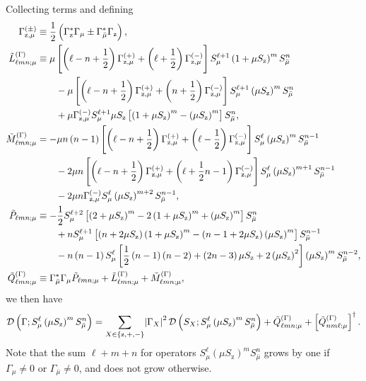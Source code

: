 \documentclass[aps,11pt,notitlepage,nofootinbib,longbibliography]{revtex4-1}
\newcommand{\f}[2]{\dfrac{#1}{#2}} %
\newcommand{\p}[1]{\left(#1\right)} %
\renewcommand{\sp}[1]{\left[#1\right]} %
\renewcommand{\set}[1]{\left\{#1\right\}} %
\newcommand{\D}{\mathcal{D}}
\newcommand{\z}{\text{z}}
\newcommand{\bmu}{{\bar\mu}}
\newcommand{\1}{\mathds{1}}
\begin{document}
Collecting terms and defining
\begin{align}
  \Gamma_{\z,\mu}^{(\pm)}
  &\equiv \f12\p{\Gamma_\z^* \Gamma_\mu \pm \Gamma_\bmu^* \Gamma_\z},
  \allowdisplaybreaks \\
  \tilde L_{\ell mn;\mu}^{(\Gamma)}
  &\equiv \mu \sp{\p{\ell-n+\f12} \Gamma_{\z,\mu}^{(+)}
    + \p{\ell+\f12} \Gamma_{\z,\mu}^{(-)}}
  S_\mu^{\ell+1} \p{1+\mu S_\z}^m S_\bmu^n \notag \\
  &\qquad -\mu \sp{\p{\ell-n+\f12} \Gamma_{\z,\mu}^{(+)}
    + \p{n+\f12} \Gamma_{\z,\mu}^{(-)}}
  S_\mu^{\ell+1} \p{\mu S_\z}^m S_\bmu^n \notag \\
  &\qquad + \mu \Gamma_{\z,\mu}^{(-)}
  S_\mu^{\ell+1} \mu S_\z
  \sp{\p{1+\mu S_\z}^m - \p{\mu S_\z}^m} S_\bmu^n,
  \allowdisplaybreaks \\
  \tilde M_{\ell mn;\mu}^{(\Gamma)}
  &= -\mu n\p{n-1} \sp{\p{\ell-n+\f12} \Gamma_{\z,\mu}^{(+)}
    + \p{\ell-\f12} \Gamma_{\z,\mu}^{(-)}}
  S_\mu^\ell \p{\mu S_\z}^m S_\bmu^{n-1} \notag \\
  &\qquad - 2\mu n \sp{\p{\ell-n+\f12} \Gamma_{\z,\mu}^{(+)}
    + \p{\ell+\f12n-1} \Gamma_{\z,\mu}^{(-)}}
  S_\mu^\ell \p{\mu S_\z}^{m+1} S_\bmu^{n-1} \notag \\
  &\qquad - 2\mu n \Gamma_{\z,\mu}^{(-)}
  S_\mu^\ell \p{\mu S_\z}^{m+2} S_\bmu^{n-1},
  \allowdisplaybreaks \\
  \tilde P_{\ell mn;\mu}
  &\equiv -\f12 S_\mu^{\ell+2}
  \sp{\p{2+\mu S_\z}^m - 2\p{1+\mu S_\z}^m + \p{\mu S_\z}^m}
  S_\bmu^n \notag \\
  &\qquad + n S_\mu^{\ell+1} \sp{\p{n+2\mu S_\z} \p{1+\mu S_\z}^m
    - \p{n-1+2\mu S_\z} \p{\mu S_\z}^m}
  S_\bmu^{n-1} \notag \\
  &\qquad -n\p{n-1} S_\mu^\ell
  \sp{\f12\p{n-1}\p{n-2} + \p{2n-3}\mu S_\z + 2\p{\mu S_\z}^2}
  \p{\mu S_\z}^m S_\bmu^{n-2},
  \allowdisplaybreaks \\
  \tilde Q_{\ell mn;\mu}^{(\Gamma)}
  &\equiv \Gamma_\bmu^* \Gamma_\mu \tilde P_{\ell mn;\mu}
  + \tilde L_{\ell mn;\mu}^{(\Gamma)}
  + \tilde M_{\ell mn;\mu}^{(\Gamma)},
\end{align}
we then have
\begin{align}
  \D\p{\Gamma; S_\mu^\ell \p{\mu S_\z}^m S_\bmu^n}
  = \sum_{X\in\set{\z,+,-}} \abs{\Gamma_X}^2
  \D\p{S_X; S_\mu^\ell \p{\mu S_\z}^m S_\bmu^n}
  + \tilde Q_{\ell mn;\mu}^{(\Gamma)}
  + \sp{\tilde Q_{nm\ell;\mu}^{(\Gamma)}}^\dag.
\end{align}
Note that the sum $\ell+m+n$ for operators
$S_\mu^\ell \p{\mu S_\z}^m S_\bmu^n$ grows by one if $\Gamma_\mu\ne0$
or $\Gamma_\bmu\ne0$, and does not grow otherwise.
\end{document}
